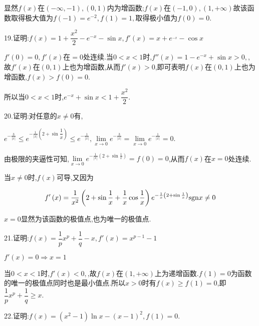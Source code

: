 显然$f(x)$在$\left( { - \infty , - 1} \right),\left( {0,1} \right)$内为增函数;$f(x)$在$\left( { - 1,0} \right),\left( {1, + \infty } \right)$故该函数取得极大值为$f\left( { - 1} \right) = {e^{ - 2}},f\left( 1 \right) = 1,$取得极小值为$f\left( 0 \right) = 0.$

19.证明:$f\left( x \right) = 1 + \dfrac{{{x^2}}}{2} - {e^{ - x}} - \sin x,f'\left( x \right) = x + {e^{_{ - x}}} - \cos x$

$f'\left( 0 \right) = 0,$$f'\left( x \right)$在$ = 0$处连续.当$0 < x < 1$时,$f''\left( x \right) = 1 - {e^{ - x}} + \sin x > 0,$,故$f'\left( x \right)$在$(0,1)$上也为增函数,从而$f'\left( x \right) > 0$,即可表明$f\left( x \right)$在$(0,1)$上也为增函数,$f\left( x \right) > f\left( 0 \right) = 0$.

所以当$0 < x < 1$时,${e^{ - x}} + \sin x < 1 + \dfrac{{{x^2}}}{2}$.

20.证明:对任意的$x \ne 0$有,

${e^{ - \frac{3}{{\left| x \right|}}}} \le {e^{ - \frac{1}{{\left| x \right|}}\left( {2 + \sin \dfrac{1}{x}} \right)}} \le {e^{ - \frac{1}{{\left| x \right|}}}},\mathop {\lim }\limits_{x \to 0} {e^{ - \frac{3}{{\left| x \right|}}}} = \mathop {\lim }\limits_{x \to 0} {e^{ - \frac{1}{{\left| x \right|}}}} = 0.$

由极限的夹逼性可知,$\mathop {\lim }\limits_{x \to 0} {e^{ - \frac{1}{{\left| x \right|}}\left( {2 + \sin \frac{1}{x}} \right)}} = f\left( 0 \right) = 0$,从而$f\left( x \right)$在$x = 0$处连续.

当$x \ne 0$时,$f\left( x \right)$可导,又因为

$$f'\left( x \right) = \dfrac{1}{{{x^2}}}\left( {2 + \sin \dfrac{1}{x} + \dfrac{1}{x}\cos \dfrac{1}{x}} \right){e^{ - \frac{1}{x}\left( {2 + \sin \frac{1}{x}} \right)}}{\mathop{\rm sgn}} x \ne 0$$

$x = 0$显然为该函数的极值点,也为唯一的极值点.

21.证明:$f\left( x \right) = \dfrac{1}{p}{x^p} + \dfrac{1}{q} - x,f'\left( x \right) = {x^{p - 1}} - 1$

$f'\left( x \right) = 0 \Rightarrow x = 1$

当$0 < x < 1$时,$f'\left( x \right) < 0,$,故$f\left( x \right)$在$\left( {1, + \infty } \right)$上为递增函数.$f\left( 1 \right) = 0$为函数的唯一的极值点同时也是最小值点.所以$x > 0$时有$f\left( x \right) \ge f\left( 1 \right) = 0$,即$\dfrac{1}{p}{x^p} + \dfrac{1}{q} \ge x.$

22.证明:$f\left( x \right) = \left( {{x^2} - 1} \right)\ln x - {\left( {x - 1} \right)^2},f\left( 1 \right) = 0.$

